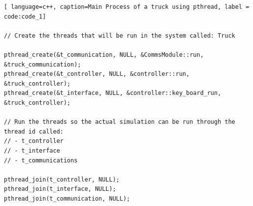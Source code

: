 \begin{lstlisting}[ language=c++, caption=Main Process of a truck using pthread, label = code:code_1]

// Create the threads that will be run in the system called: Truck

pthread_create(&t_communication, NULL, &CommsModule::run, &truck_communication);
pthread_create(&t_controller, NULL, &controller::run, &truck_controller);
pthread_create(&t_interface, NULL, &controller::key_board_run, &truck_controller);

// Run the threads so the actual simulation can be run through the thread id called:
// - t_controller
// - t_interface
// - t_communications

pthread_join(t_controller, NULL);
pthread_join(t_interface, NULL);
pthread_join(t_communication, NULL);

\end{lstlisting}

